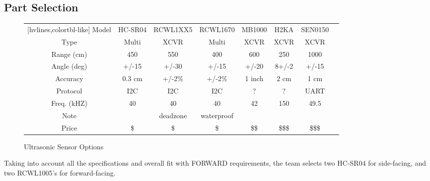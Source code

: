 \subsection{Part Selection}

\begin{figure}[h]
	\centering
	\setlength{\tabcolsep}{5pt} %
	\renewcommand{\arraystretch}{1.5} %
	\begin{NiceTabular}{cccccccc}[hvlines,colortbl-like]
		\CodeBefore
		\columncolor{}{}
		\Body
		Model       & HC-SR04 & RCWL1XX5 & RCWL1670   & MB1000 & H2KA  & SEN0150 \\
		Type        & Multi   & XCVR     & Multi      & XCVR   & XCVR  & XCVR \\  
		Range (cm)  & 450     & 550      & 400        & 600    & 250   & 1000 \\
		Angle (deg) & +/-15   & +/-30    & +/-15      & +/-20  & 8+/-2 & +/-15 \\
		Accuracy    & 0.3 cm  & +/-2\%   & +/-2\%     & 1 inch & 2 cm  & 1 cm \\
		Protocol    & I2C     & I2C      & I2C        & ?      & ?     & UART \\
		Freq. (kHZ) & 40      & 40       & 40         & 42     & 150   & 49.5 \\
		Note        &         & deadzone & waterproof &        &       &      \\
		Price       & \$      & \$       & \$         & \$\$   & \$\$\$& \$\$\$
	\end{NiceTabular}
	\caption{\label{fig:compareUltrasonic}Ultrasonic Sensor Options}
\end{figure}

\noindent Taking into account all the specifications and overall fit with FORWARD requirements, the team selects two HC-SR04 for side-facing, and two RCWL1005's for forward-facing.\\

